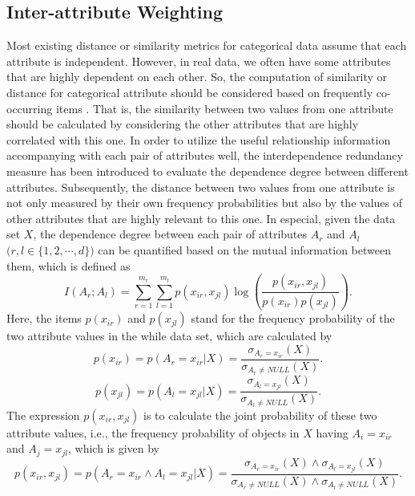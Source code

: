 \documentclass[review]{elsarticle}
\begin{document}
\subsection{Inter-attribute Weighting}
Most existing distance or similarity metrics for categorical data assume that each attribute is independent. However, in real data, we often have some attributes that are highly dependent on each other. So, the computation of similarity or distance for categorical attribute should be considered based on frequently co-occurring items \cite{VGanti1999CACTUS}. That is, the similarity between two values from one attribute should be calculated by considering the other attributes that are highly correlated with this one. In order to utilize the useful relationship information accompanying with each pair of attributes well, the interdependence redundancy measure \cite{WaiHoAu2005Grouping} has been introduced to evaluate the dependence degree between different attributes. Subsequently, the distance between two values from one attribute is not only measured by their own frequency probabilities but also by the values of other attributes that are highly relevant to this one. In especial, given the data set $X$, the dependence degree between each pair of attributes $A_r$ and $A_l$ $\mathbf (r,l \in \{1,2,\cdots,d\})$ can be quantified based on the mutual information \cite{MacKay2003InformationTheory} between them, which is defined as
\begin{equation}
I(A_r;A_l) = \sum_{r=1}^{m_r}\sum_{l=1}^{m_l}p(x_{ir},x_{jl})\log(\frac{p(x_{ir},x_{jl})}{p(x_{ir})p(x_{jl})}).
\label{equ10}
\end{equation}
Here, the items $p(x_{ir})$ and $p(x_{jl})$ stand for the frequency probability of the two attribute values in the while data set, which are calculated by
\begin{equation}
p(x_{ir}) = p(A_r = x_{ir}|X) = \frac{\sigma_{A_r = x_{ir}}(X)}{\sigma_{A_r \neq NULL}(X)}.
\label{equ11}
\end{equation}
\begin{equation}
p(x_{jl}) = p(A_l = x_{jl}|X) = \frac{\sigma_{A_l = x_{jl}}(X)}{\sigma_{A_l \neq NULL}(X)}.
\label{equ12}
\end{equation}
The expression $p(x_{ir},x_{jl})$ is to calculate the joint probability of these two attribute values, i.e., the frequency probability of objects in $X$ having $A_i = x_{ir}$ and $A_j = x_{jl}$, which is given by
\begin{equation}
p(x_{ir},x_{jl}) = p(A_r = x_{ir} \wedge A_l = x_{jl}|X) = \frac{\sigma_{A_r = x_{ir}}(X) \wedge \sigma_{A_l = x_{jl}}(X)}{\sigma_{A_r \neq NULL}(X) \wedge \sigma_{A_l \neq NULL}(X)}.
\label{equ13}
\end{equation}
\end{document}

